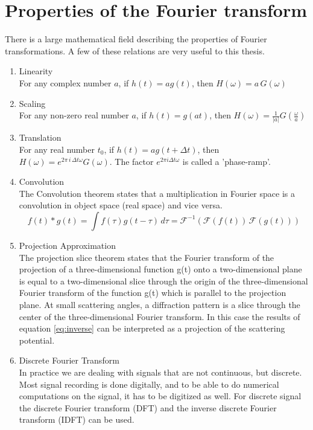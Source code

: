 \section{Properties of the Fourier transform}
There is a large mathematical field describing the properties of Fourier transformations. A few of these relations are very useful to this thesis.
\begin{enumerate}

\item Linearity\\
	For any complex number $a$, if $h(t) = a g(t)$, then $H(\omega) = a \, G(\omega)$

\item Scaling\\
	For any non-zero real number $a$, if $h(t) = g(a t)$, then $H(\omega) = \frac{1}{|a|} G\left(\frac{\omega}{a}\right)$

\item Translation\\
	For any real number $t_0$, if $h(t) = a g(t+\Delta t)$, then $H(\omega) = e^{2\pi\,i\,\Delta t \omega} G(\omega)$. The factor $e^{2 \pi i \Delta t \omega}$ is called a 'phase-ramp'.

\item Convolution\\
The Convolution theorem states that a multiplication in Fourier space is a convolution in object space (real space) and vice versa.
\begin{equation}
f(t) * g(t) = \int f(\tau)g(t-\tau)\,d\tau = \mathcal{F}^{-1} \left( \mathcal{F}(f(t))\,\mathcal{F}(g(t))\right)
\end{equation}

\item {Projection Approximation}\\
The projection slice theorem states that the Fourier transform of the projection of a three-dimensional function g(t) onto a two-dimensional plane is equal to a two-dimensional slice through the origin of the three-dimensional Fourier transform of the function g(t)
which is parallel to the projection plane. At small scattering angles, a diffraction pattern is a slice through the center of the three-dimensional Fourier transform. In this case the results of equation \ref{eq:inverse} can be interpreted as a projection of the scattering potential. 

\item {Discrete Fourier Transform}\\
In practice we are dealing with signals that are not continuous, but discrete. Most signal recording is done digitally, and to be able to do numerical computations on the signal, it has to be digitized as well. For discrete signal the discrete Fourier transform (DFT) and the inverse discrete Fourier transform (IDFT) can be used.


\end{enumerate}
